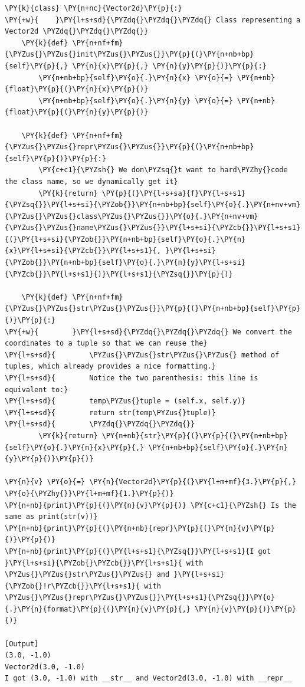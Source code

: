 \begin{Verbatim}[label=\makebox{\url{https://github.com/lucabaldini/cmepda/tree/master/slides/latex/snippets/vector2d\_printable.py}},commandchars=\\\{\}]
\PY{k}{class} \PY{n+nc}{Vector2d}\PY{p}{:}
\PY{+w}{    }\PY{l+s+sd}{\PYZdq{}\PYZdq{}\PYZdq{} Class representing a Vector2d \PYZdq{}\PYZdq{}\PYZdq{}}
    \PY{k}{def} \PY{n+nf+fm}{\PYZus{}\PYZus{}init\PYZus{}\PYZus{}}\PY{p}{(}\PY{n+nb+bp}{self}\PY{p}{,} \PY{n}{x}\PY{p}{,} \PY{n}{y}\PY{p}{)}\PY{p}{:}
        \PY{n+nb+bp}{self}\PY{o}{.}\PY{n}{x} \PY{o}{=} \PY{n+nb}{float}\PY{p}{(}\PY{n}{x}\PY{p}{)}
        \PY{n+nb+bp}{self}\PY{o}{.}\PY{n}{y} \PY{o}{=} \PY{n+nb}{float}\PY{p}{(}\PY{n}{y}\PY{p}{)}

    \PY{k}{def} \PY{n+nf+fm}{\PYZus{}\PYZus{}repr\PYZus{}\PYZus{}}\PY{p}{(}\PY{n+nb+bp}{self}\PY{p}{)}\PY{p}{:}
        \PY{c+c1}{\PYZsh{} We don\PYZsq{}t want to hard\PYZhy{}code the class name, so we dynamically get it}
        \PY{k}{return} \PY{p}{(}\PY{l+s+sa}{f}\PY{l+s+s1}{\PYZsq{}}\PY{l+s+si}{\PYZob{}}\PY{n+nb+bp}{self}\PY{o}{.}\PY{n+nv+vm}{\PYZus{}\PYZus{}class\PYZus{}\PYZus{}}\PY{o}{.}\PY{n+nv+vm}{\PYZus{}\PYZus{}name\PYZus{}\PYZus{}}\PY{l+s+si}{\PYZcb{}}\PY{l+s+s1}{(}\PY{l+s+si}{\PYZob{}}\PY{n+nb+bp}{self}\PY{o}{.}\PY{n}{x}\PY{l+s+si}{\PYZcb{}}\PY{l+s+s1}{, }\PY{l+s+si}{\PYZob{}}\PY{n+nb+bp}{self}\PY{o}{.}\PY{n}{y}\PY{l+s+si}{\PYZcb{}}\PY{l+s+s1}{)}\PY{l+s+s1}{\PYZsq{}}\PY{p}{)}

    \PY{k}{def} \PY{n+nf+fm}{\PYZus{}\PYZus{}str\PYZus{}\PYZus{}}\PY{p}{(}\PY{n+nb+bp}{self}\PY{p}{)}\PY{p}{:}
\PY{+w}{        }\PY{l+s+sd}{\PYZdq{}\PYZdq{}\PYZdq{} We convert the coordinates to a tuple so that we can reuse the}
\PY{l+s+sd}{        \PYZus{}\PYZus{}str\PYZus{}\PYZus{} method of tuples, which already provides a nice formatting.}
\PY{l+s+sd}{        Notice the two parenthesis: this line is equivalent to:}
\PY{l+s+sd}{        temp\PYZus{}tuple = (self.x, self.y)}
\PY{l+s+sd}{        return str(temp\PYZus{}tuple)}
\PY{l+s+sd}{        \PYZdq{}\PYZdq{}\PYZdq{}}
        \PY{k}{return} \PY{n+nb}{str}\PY{p}{(}\PY{p}{(}\PY{n+nb+bp}{self}\PY{o}{.}\PY{n}{x}\PY{p}{,} \PY{n+nb+bp}{self}\PY{o}{.}\PY{n}{y}\PY{p}{)}\PY{p}{)}

\PY{n}{v} \PY{o}{=} \PY{n}{Vector2d}\PY{p}{(}\PY{l+m+mf}{3.}\PY{p}{,} \PY{o}{\PYZhy{}}\PY{l+m+mf}{1.}\PY{p}{)}
\PY{n+nb}{print}\PY{p}{(}\PY{n}{v}\PY{p}{)} \PY{c+c1}{\PYZsh{} Is the same as print(str(v))}
\PY{n+nb}{print}\PY{p}{(}\PY{n+nb}{repr}\PY{p}{(}\PY{n}{v}\PY{p}{)}\PY{p}{)}
\PY{n+nb}{print}\PY{p}{(}\PY{l+s+s1}{\PYZsq{}}\PY{l+s+s1}{I got }\PY{l+s+si}{\PYZob{}\PYZcb{}}\PY{l+s+s1}{ with \PYZus{}\PYZus{}str\PYZus{}\PYZus{} and }\PY{l+s+si}{\PYZob{}!r\PYZcb{}}\PY{l+s+s1}{ with \PYZus{}\PYZus{}repr\PYZus{}\PYZus{}}\PY{l+s+s1}{\PYZsq{}}\PY{o}{.}\PY{n}{format}\PY{p}{(}\PY{n}{v}\PY{p}{,} \PY{n}{v}\PY{p}{)}\PY{p}{)}

[Output]
(3.0, -1.0)
Vector2d(3.0, -1.0)
I got (3.0, -1.0) with __str__ and Vector2d(3.0, -1.0) with __repr__
\end{Verbatim}